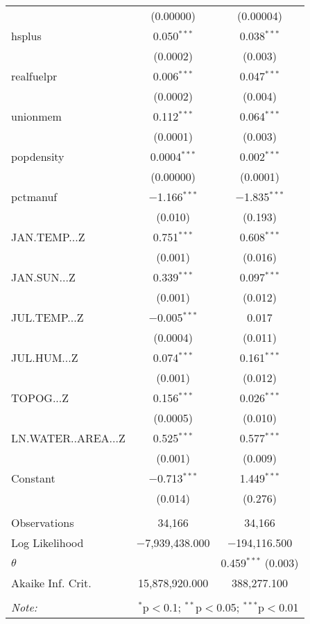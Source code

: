 \begin{table}[!htbp]
\begin{tabular}{@{\extracolsep{5pt}}lcc}
  & (0.00000) & (0.00004) \\ 
  hsplus & 0.050$^{***}$ & 0.038$^{***}$ \\ 
  & (0.0002) & (0.003) \\ 
  realfuelpr & 0.006$^{***}$ & 0.047$^{***}$ \\ 
  & (0.0002) & (0.004) \\ 
  unionmem & 0.112$^{***}$ & 0.064$^{***}$ \\ 
  & (0.0001) & (0.003) \\ 
  popdensity & 0.0004$^{***}$ & 0.002$^{***}$ \\ 
  & (0.00000) & (0.0001) \\ 
  pctmanuf & $-$1.166$^{***}$ & $-$1.835$^{***}$ \\ 
  & (0.010) & (0.193) \\ 
  JAN.TEMP...Z & 0.751$^{***}$ & 0.608$^{***}$ \\ 
  & (0.001) & (0.016) \\ 
  JAN.SUN...Z & 0.339$^{***}$ & 0.097$^{***}$ \\ 
  & (0.001) & (0.012) \\ 
  JUL.TEMP...Z & $-$0.005$^{***}$ & 0.017 \\ 
  & (0.0004) & (0.011) \\ 
  JUL.HUM...Z & 0.074$^{***}$ & 0.161$^{***}$ \\ 
  & (0.001) & (0.012) \\ 
  TOPOG...Z & 0.156$^{***}$ & 0.026$^{***}$ \\ 
  & (0.0005) & (0.010) \\ 
  LN.WATER..AREA...Z & 0.525$^{***}$ & 0.577$^{***}$ \\ 
  & (0.001) & (0.009) \\ 
  Constant & $-$0.713$^{***}$ & 1.449$^{***}$ \\ 
  & (0.014) & (0.276) \\ 
 \hline \\[-1.8ex] 
Observations & 34,166 & 34,166 \\ 
Log Likelihood & $-$7,939,438.000 & $-$194,116.500 \\ 
$\theta$ &  & 0.459$^{***}$  (0.003) \\ 
Akaike Inf. Crit. & 15,878,920.000 & 388,277.100 \\ 
\hline 
\hline \\[-1.8ex] 
\textit{Note:}  & \multicolumn{2}{r}{$^{*}$p$<$0.1; $^{**}$p$<$0.05; $^{***}$p$<$0.01} \\ 
\end{tabular} 
\end{table} 
